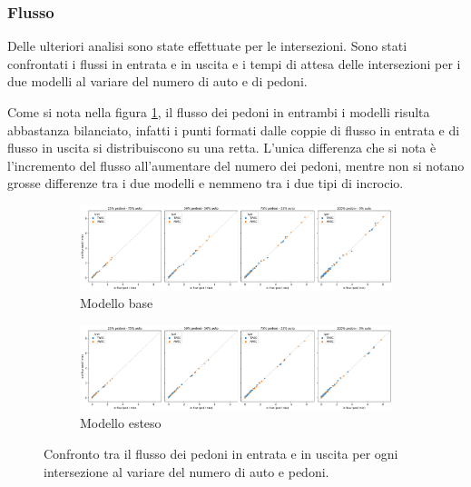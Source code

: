 \pagebreak

\subsubsection*{Flusso}
Delle ulteriori analisi sono state effettuate per le intersezioni. Sono stati confrontati i 
flussi in entrata e in uscita e i tempi di attesa delle intersezioni per i due modelli 
al variare del numero di auto e di pedoni.

%
Come si nota nella figura \ref{fig:analisi-comparison-in-out-flow-ped}, il flusso dei pedoni
in entrambi i modelli risulta abbastanza bilanciato,
infatti i punti formati dalle coppie di flusso in entrata e di flusso in uscita si distribuiscono su una retta.
L'unica differenza che si nota è l'incremento del flusso all'aumentare del numero dei pedoni,
mentre non si notano grosse differenze tra i due modelli e nemmeno tra i due tipi di incrocio.

\begin{figure}[ht]
    \centering
    \begin{subfigure}{0.9\textwidth}
        \centering
        \includegraphics[width=\textwidth]{images/analisi/comparison-base-in-out-flow-ped.png}
        \caption{Modello base}
    \end{subfigure}
    \hfill
    \begin{subfigure}{0.9\textwidth}
        \centering
        \includegraphics[width=\textwidth]{images/analisi/comparison-new-in-out-flow-ped.png}
        \caption{Modello esteso}
    \end{subfigure}
    \caption{
        Confronto tra il flusso dei pedoni in entrata e in uscita per ogni intersezione al variare del numero di auto e pedoni.
    }
    \label{fig:analisi-comparison-in-out-flow-ped}
\end{figure}

